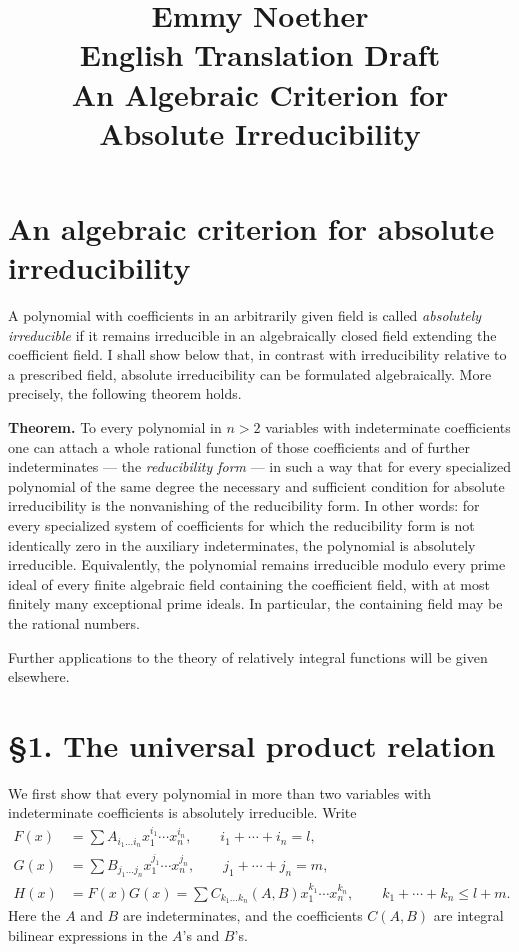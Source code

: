 \documentclass[11pt]{article}
\title{Emmy Noether\\English Translation Draft\\An Algebraic Criterion for Absolute Irreducibility}
\author{}
\date{}
\begin{document}
\maketitle

\section*{An algebraic criterion for absolute irreducibility}

A polynomial with coefficients in an arbitrarily given field is called \emph{absolutely irreducible} if it remains irreducible in an algebraically closed field extending the coefficient field. I shall show below that, in contrast with irreducibility relative to a prescribed field, absolute irreducibility can be formulated algebraically. More precisely, the following theorem holds.

\medskip
\noindent\textbf{Theorem.}
To every polynomial in $n>2$ variables with indeterminate coefficients one can attach a whole rational function of those coefficients and of further indeterminates --- the \emph{reducibility form} --- in such a way that for every specialized polynomial of the same degree the necessary and sufficient condition for absolute irreducibility is the nonvanishing of the reducibility form. In other words: for every specialized system of coefficients for which the reducibility form is not identically zero in the auxiliary indeterminates, the polynomial is absolutely irreducible. Equivalently, the polynomial remains irreducible modulo every prime ideal of every finite algebraic field containing the coefficient field, with at most finitely many exceptional prime ideals. In particular, the containing field may be the rational numbers.

Further applications to the theory of relatively integral functions will be given elsewhere.

\section*{\S 1. The universal product relation}

We first show that every polynomial in more than two variables with indeterminate coefficients is absolutely irreducible. Write
\begin{align}
F(x) &= \sum A_{i_1\dots i_n}x_1^{i_1}\cdots x_n^{i_n}, \qquad i_1+\cdots+i_n=l, \tag{0.1}\\
G(x) &= \sum B_{j_1\dots j_n}x_1^{j_1}\cdots x_n^{j_n}, \qquad j_1+\cdots+j_n=m, \tag{0.2}\\
H(x) &= F(x)G(x)=\sum C_{k_1\dots k_n}(A,B)x_1^{k_1}\cdots x_n^{k_n},
\qquad k_1+\cdots+k_n\le l+m. \tag{0.3}
\end{align}
Here the $A$ and $B$ are indeterminates, and the coefficients $C(A,B)$ are integral bilinear expressions in the $A$'s and $B$'s.
\end{document}
